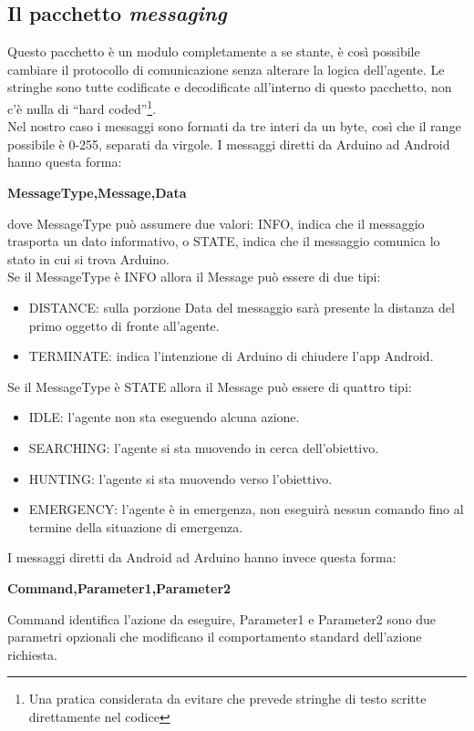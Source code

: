 \subsection{Il pacchetto \textit{messaging}}
Questo pacchetto è un modulo completamente a se stante, è così possibile cambiare il
 protocollo di comunicazione senza alterare la logica dell'agente. Le stringhe sono 
 tutte codificate e decodificate all'interno di questo pacchetto, non c'è nulla di 
 ``hard coded''\footnote{Una pratica considerata da evitare che prevede stringhe di 
 testo scritte direttamente nel codice}.
 \\ Nel nostro caso i messaggi sono formati da tre interi da un byte, così che il 
 range possibile è 0-255, separati da virgole.
 I messaggi diretti da Arduino ad Android hanno questa forma:
 \begin{center}
 \textbf{MessageType,Message,Data}
 \end{center}
 dove MessageType può assumere due valori: INFO, indica che il messaggio trasporta un
 dato informativo, o STATE, indica che il messaggio comunica lo stato in cui si trova Arduino.
 \\Se il MessageType è INFO allora il Message può essere di due tipi: 
 \begin{itemize}\item DISTANCE: sulla porzione Data del messaggio sarà presente 
 la distanza del primo oggetto di fronte all'agente.
 \item TERMINATE: indica l'intenzione di Arduino di chiudere l'app Android.
 \end{itemize}
 Se il MessageType è STATE allora il Message può essere di quattro tipi: 
 \begin{itemize}
 	\item IDLE: l'agente non sta eseguendo alcuna azione.
 	\item SEARCHING: l'agente si sta muovendo in cerca dell'obiettivo.
 	\item HUNTING: l'agente si sta muovendo verso l'obiettivo.
 	\item EMERGENCY: l'agente è in emergenza, non eseguirà nessun comando fino al 
 	termine della situazione di emergenza. 
 \end{itemize}
  I messaggi diretti da Android ad Arduino hanno invece questa forma:
 \begin{center}
 \textbf{Command,Parameter1,Parameter2}
 \end{center}
 Command identifica l'azione da eseguire, Parameter1 e Parameter2 sono due parametri opzionali
 che modificano il comportamento standard dell'azione richiesta.
